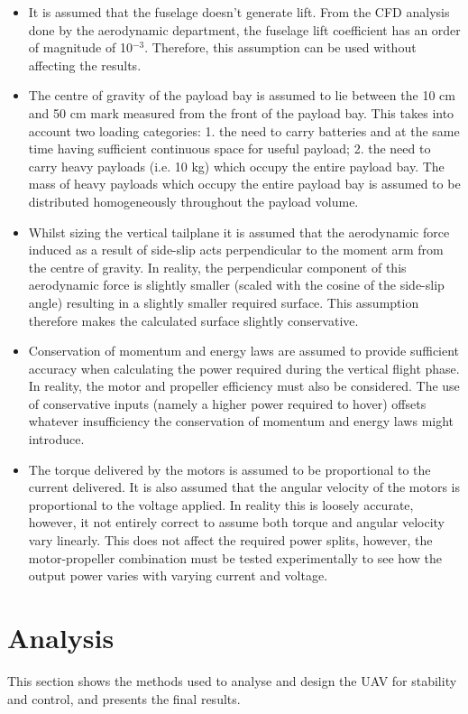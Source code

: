 \begin{itemize}
    \item It is assumed that the fuselage doesn't generate lift. From the CFD analysis done by the aerodynamic department, the fuselage lift coefficient has an order of magnitude of 10$^{-3}$. Therefore, this assumption can be used without affecting the results.
    \item The centre of gravity of the payload bay is assumed to lie between the 10 cm and 50 cm mark measured from the front of the payload bay. This takes into account two loading categories: 1. the need to carry batteries and at the same time having sufficient continuous space for useful payload; 2. the need to carry heavy payloads (i.e. 10 kg) which occupy the entire payload bay. The mass of heavy payloads which occupy the entire payload bay is assumed to be distributed homogeneously throughout the payload volume.
    \item Whilst sizing the vertical tailplane it is assumed that the aerodynamic force induced as a result of side-slip acts perpendicular to the moment arm from the centre of gravity. In reality, the perpendicular component of this aerodynamic force is slightly smaller (scaled with the cosine of the side-slip angle) resulting in a slightly smaller required surface. This assumption therefore makes the calculated surface slightly conservative.
    \item Conservation of momentum and energy laws are assumed to provide sufficient accuracy when calculating the power required during the vertical flight phase. In reality, the motor and propeller efficiency must also be considered. The use of conservative inputs (namely a higher power required to hover) offsets whatever insufficiency the conservation of momentum and energy laws might introduce.
    \item The torque delivered by the motors is assumed to be proportional to the current delivered. It is also assumed that the angular velocity of the motors is proportional to the voltage applied. In reality this is loosely accurate, however, it not entirely correct to assume both torque and angular velocity vary linearly. This does not affect the required power splits, however, the motor-propeller combination must be tested experimentally to see how the output power varies with varying current and voltage.
\end{itemize}

\section{Analysis}
\label{sec:anal_snc}
This section shows the methods used to analyse and design the UAV for stability and control, and presents the final results. 

